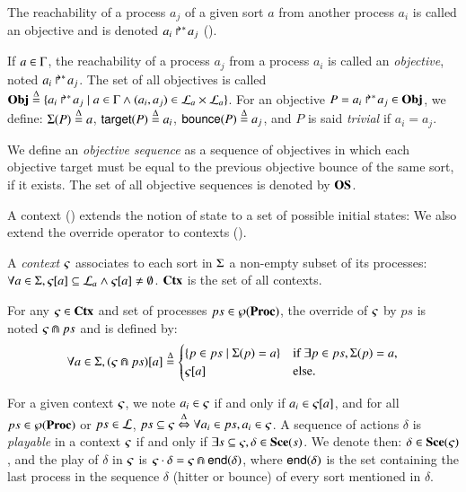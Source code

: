 The reachability of a process $a_j$ of a given sort $a$ from another process $a_i$ is called an objective and is denoted $\mbox{${a}_{i}\Rsh^*\!{a}_{j}$}$ ().
\begin{definition}
\label{def:obj}
  If $a \in \Gamma$, the reachability of a process $a_j$ from a process $a_i$ is called an \emph{objective}, noted $\mbox{$a_i\Rsh^*\!a_j$}$.
  The set of all objectives is called $\mathbf{Obj} \stackrel{\Delta}= \{ \mbox{$a_i\Rsh^*\!a_j$} \mid a \in \Gamma \wedge (a_i, a_j) \in \mathcal{L}_a \times \mathcal{L}_a \}$.
  For an objective $P = \mbox{$a_i\Rsh^*\!a_j$} \in \mathbf{Obj}$, we define: $\Sigma(P) \stackrel{\Delta}=
  a$, $\mathsf{target}(P)\stackrel{\Delta}= a_i$, $\mathsf{bounce}(P)\stackrel{\Delta}= a_j$,
  and $P$ is said \emph{trivial} if $a_i = a_j$.

  We define an \emph{objective sequence} as a sequence of objectives in which each objective target must be equal to the previous objective bounce of the same sort, if it exists.
  The set of all objective sequences is denoted by $\mathbf{OS}$.
\end{definition}

A context () extends the notion of state to a set of possible initial states:
We also extend the override operator to contexts ().
\begin{definition}
\label{def:context}
  A \emph{context} $\varsigma$ associates to each sort in $\Sigma$ a non-empty subset of its processes:
  $\forall a \in \Sigma, {\varsigma[a]} \subseteq \mathcal{L}_a \wedge {\varsigma[a]} \neq \emptyset$.
  $\mathbf{Ctx}$ is the set of all contexts.
\end{definition}
%
\begin{definition}[$\Cap: \Ctx \times \powerset(\PHproc) \rightarrow \Ctx$]
\label{def:ctxcap}
  For any $\varsigma\in\mathbf{Ctx}$ and set of processes $ps \in \wp(\mathbf{Proc})$,
  the override of $\varsigma$ by $ps$ is noted $\varsigma \Cap ps$ and is defined by:
  \[ \forall a \in \Sigma, {(\varsigma \Cap ps)[a]} \stackrel{\Delta}=
  \begin{cases}
    \{ p \in ps \mid \Sigma(p)=a \} & \text{if } \exists p \in ps, \Sigma(p)=a,\\
    {\varsigma[a]} & \text{else.}
  \end{cases}
  \]
\end{definition}
\noindent
For a given context $\varsigma$, we note $a_i \in \varsigma$ if and only if $a_i \in {\varsigma[a]}$,
and for all $ps \in \wp(\mathbf{Proc})$ or $ps \in \mathcal{L}$, $ps \subseteq \varsigma \stackrel{\Delta}\Leftrightarrow \forall a_i \in ps, a_i \in \varsigma$.
A sequence of actions $\delta$ is \emph{playable} in a context $\varsigma$ if and only if 
$\exists s \subseteq \varsigma, \delta \in \mathbf{Sce}(s)$.
We denote then: $\delta \in \mathbf{Sce}(\varsigma)$,
and the play of $\delta$ in $\varsigma$ is $\varsigma \cdot \delta = \varsigma \Cap \mathsf{end}(\delta)$,
where $\mathsf{end}(\delta)$ is the set containing the last process in the sequence $\delta$ (hitter or bounce) of every sort mentioned in $\delta$.

